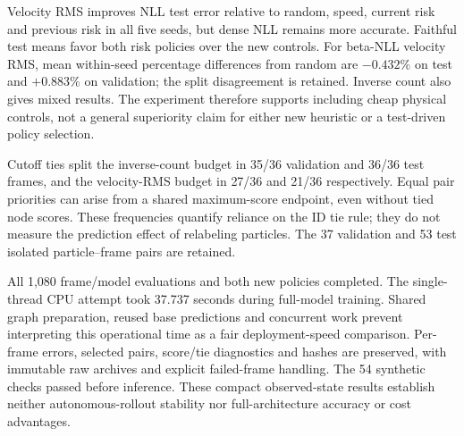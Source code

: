 Velocity RMS improves NLL test error relative to random, speed, current risk
and previous risk in all five seeds, but dense NLL remains more accurate.
Faithful test means favor both risk policies over the new controls. For
beta-NLL velocity RMS, mean within-seed percentage differences from random
are $-0.432\%$ on test and $+0.883\%$ on validation; the split disagreement
is retained. Inverse count also gives mixed results. The experiment therefore
supports including cheap physical controls, not a general superiority claim
for either new heuristic or a test-driven policy selection.

Cutoff ties split the inverse-count budget in 35/36 validation and 36/36 test
frames, and the velocity-RMS budget in 27/36 and 21/36 respectively. Equal
pair priorities can arise from a shared maximum-score endpoint, even without
tied node scores. These frequencies quantify reliance on the ID tie rule;
they do not measure the prediction effect of relabeling particles. The 37
validation and 53 test isolated particle--frame pairs are retained.

All 1,080 frame/model evaluations and both new policies completed. The
single-thread CPU attempt took 37.737 seconds during full-model training.
Shared graph preparation, reused base predictions and concurrent work prevent
interpreting this operational time as a fair deployment-speed comparison.
Per-frame errors, selected pairs, score/tie diagnostics and hashes are
preserved, with immutable raw archives and explicit failed-frame handling.
The 54 synthetic checks passed before inference. These compact observed-state
results establish neither autonomous-rollout stability nor full-architecture
accuracy or cost advantages.


